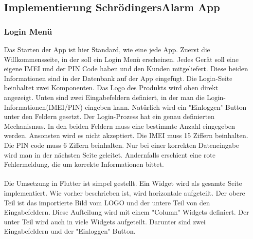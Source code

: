 \subsection{Implementierung SchrödingersAlarm App}
\subsubsection{Login Menü}
Das Starten der App ist hier Standard, wie eine jede App. Zuerst die Willkommensseite, in der soll ein Login Menü erscheinen. 
Jedes Gerät soll eine eigene IMEI und der PIN Code haben und den Kunden mitgeliefert. 
Diese beiden Informationen sind in der Datenbank auf der App eingefügt. Die Login-Seite beinhaltet zwei Komponenten.
Das Logo des Produkts wird oben direkt angezeigt. Unten sind zwei Eingabefeldern definiert,
in der man die Login-Informationen(IMEI/PIN) eingeben kann. Natürlich wird ein "Einloggen" Button unter den Feldern gesetzt.
Der Login-Prozess hat ein genau definierten Mechanismus. In den beiden Feldern muss eine bestimmte Anzahl eingegeben werden. Ansonsten wird es nicht akzeptiert. Die IMEI muss 15 Ziffern beinhalten.  Die PIN code muss 6 Ziffern beinhalten.  Nur bei einer korrekten Dateneingabe wird man in der nächsten Seite geleitet.
Andernfalls erschient eine rote Fehlermeldung, die um korrekte Informationen bittet.\\\\
Die Umsetzung in Flutter ist simpel gestellt. Ein Widget wird als gesamte Seite implementiert. 
Wie vorher beschrieben ist, wird horizontale aufgeteilt. Der obere Teil ist das importierte Bild vom LOGO und der untere Teil von den Eingabefeldern. 
Diese Aufteilung wird mit einem "Column" Widgets definiert. Der unter Teil wird auch in viele Widgets aufgeteilt. 
Darunter sind zwei Eingabefeldern und der "Einloggen" Button.
